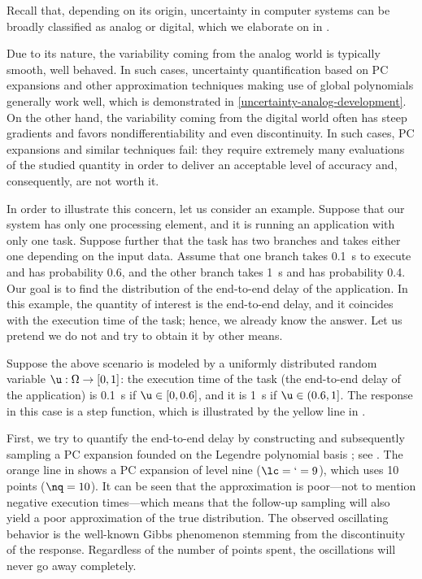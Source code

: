 Recall that, depending on its origin, uncertainty in computer systems can be
broadly classified as analog or digital, which we elaborate on in
.

Due to its nature, the variability coming from the analog world is typically
smooth, well behaved. In such cases, uncertainty quantification based on \ac{PC}
expansions \cite{xiu2010} and other approximation techniques making use of
global polynomials generally work well, which is demonstrated in
\cref{uncertainty-analog-development}. On the other hand, the variability coming
from the digital world often has steep gradients and favors nondifferentiability
and even discontinuity. In such cases, \ac{PC} expansions and similar techniques
fail: they require extremely many evaluations of the studied quantity in order
to deliver an acceptable level of accuracy and, consequently, are not worth it.

In order to illustrate this concern, let us consider an example. Suppose that
our system has only one processing element, and it is running an application
with only one task. Suppose further that the task has two branches and takes
either one depending on the input data. Assume that one branch takes 0.1~s to
execute and has probability 0.6, and the other branch takes 1~s and has
probability 0.4. Our goal is to find the distribution of the end-to-end delay of
the application. In this example, the quantity of interest is the end-to-end
delay, and it coincides with the execution time of the task; hence, we already
know the answer. Let us pretend we do not and try to obtain it by other means.

Suppose the above scenario is modeled by a uniformly distributed random variable
$\u: \Omega \to [0, 1]$: the execution time of the task (the end-to-end delay of
the application) is 0.1~s if $\u \in [0, 0.6]$, and it is 1~s if $\u \in (0.6,
1]$. The response in this case is a step function, which is illustrated by the
yellow line in .

First, we try to quantify the end-to-end delay by constructing and subsequently
sampling a \ac{PC} expansion founded on the Legendre polynomial basis
\cite{xiu2010}; see . The orange line in
 shows a \ac{PC} expansion of level nine ($\lc = \lq =
9$), which uses 10 points ($\nq = 10$). It can be seen that the approximation is
poor---not to mention negative execution times---which means that the follow-up
sampling will also yield a poor approximation of the true distribution. The
observed oscillating behavior is the well-known Gibbs phenomenon stemming from
the discontinuity of the response. Regardless of the number of points spent, the
oscillations will never go away completely.


